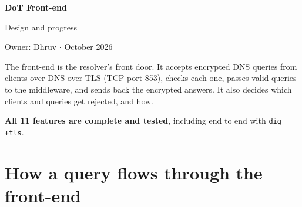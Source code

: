 \documentclass[11pt,a4paper]{article}
\begin{document}
\thispagestyle{empty}
{\Huge\bfseries DoT Front-end}\par
\vspace{4pt}
{\Large\color{muted} Design and progress}\par
\vspace{6pt}
{\small\color{muted} Owner: Dhruv \quad$\cdot$ October 2026}\par
\vspace{14pt}

The front-end is the resolver's front door. It accepts encrypted DNS queries from clients over
DNS-over-TLS (TCP port 853), checks each one, passes valid queries to the middleware, and sends
back the encrypted answers. It also decides which clients and queries get rejected, and how.

\textbf{All 11 features are complete and tested}, including end to end with \texttt{dig +tls}.

\section{How a query flows through the front-end}
\end{document}
